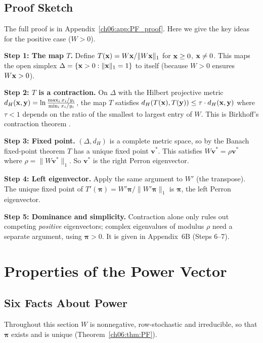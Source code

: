 \documentclass[../structural_economics_book.tex]{subfiles}
\begin{document}
\subsection{Proof Sketch}

The full proof is in Appendix~\ref{ch06:app:PF_proof}. Here we give the key ideas for the positive case ($W > 0$).

\textbf{Step 1: The map $T$.} Define $T(\mathbf{x}) = W\mathbf{x} / \|W\mathbf{x}\|_1$ for $\mathbf{x} \geq 0$, $\mathbf{x} \neq 0$. This maps the open simplex $\Delta = \{\mathbf{x} > 0 : \|\mathbf{x}\|_1 = 1\}$ to itself (because $W > 0$ ensures $W\mathbf{x} > 0$).

\textbf{Step 2: $T$ is a contraction.} On $\Delta$ with the Hilbert projective metric $d_H(\mathbf{x}, \mathbf{y}) = \ln\frac{\max_i x_i/y_i}{\min_i x_i/y_i}$, the map $T$ satisfies $d_H(T(\mathbf{x}), T(\mathbf{y})) \leq \tau \cdot d_H(\mathbf{x}, \mathbf{y})$ where $\tau < 1$ depends on the ratio of the smallest to largest entry of $W$. This is Birkhoff's contraction theorem \citeyearpar{birkhoff1957extensions}.

\textbf{Step 3: Fixed point.} $(\Delta, d_H)$ is a complete metric space, so by the Banach fixed-point theorem $T$ has a unique fixed point $\mathbf{v}^*$. This satisfies $W\mathbf{v}^* = \rho \mathbf{v}^*$ where $\rho = \|W\mathbf{v}^*\|_1$. So $\mathbf{v}^*$ is the right Perron eigenvector.

\textbf{Step 4: Left eigenvector.} Apply the same argument to $W'$ (the transpose). The unique fixed point of $T'(\boldsymbol{\pi}) = W'\boldsymbol{\pi}/\|W'\boldsymbol{\pi}\|_1$ is $\boldsymbol{\pi}$, the left Perron eigenvector.

\textbf{Step 5: Dominance and simplicity.} Contraction alone only rules out competing \textit{positive} eigenvectors; complex eigenvalues of modulus $\rho$ need a separate argument, using $\boldsymbol{\pi} > 0$. It is given in Appendix~6B (Steps 6--7).


\section{Properties of the Power Vector}
\label{ch06:sec:properties}

\subsection{Six Facts About Power}

Throughout this section $W$ is nonnegative, row-stochastic and irreducible, so that $\boldsymbol{\pi}$ exists and is unique (Theorem~\ref{ch06:thm:PF}).
\end{document}
